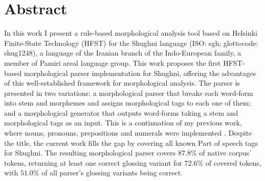 \section*{Abstract}

In this work I present a rule-based morphological analysis tool based on Helsinki Finite-State Technology (HFST) for the Shughni language (ISO: sgh; glottocode: shug1248), a language of the Iranian branch of the Indo-European family, a member of Pamiri areal language group. This work proposes the first HFST-based morphological parser implementation for Shughni, offering the advantages of this well-established framework for morphological analysis. The parser is presented in two variations: a morphological parser that breaks each word-form into stem and morphemes and assigns morphological tags to each one of them; and a morphological generator that outputs word-forms taking a stem and morphological tags as an input. This is a continuation of my previous work, where nouns, pronouns, prepositions and numerals were implemented \parencite{osorgin_2024_twol}. Despite the title, the current work fills the gap by covering all known Part of speech tags for Shughni. The resulting morphological parser covers $87.8\%$ of native corpus' tokens, returning at least one correct glossing variant for $72.6\%$ of covered tokens, with $51.0\%$ of all parser's glossing variants being correct.

\newpage